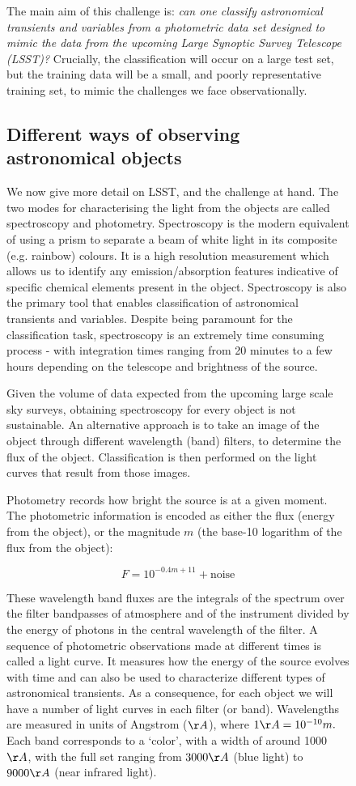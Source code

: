 \documentclass[\docopts]{\docclass}
\begin{document}
\begin{figure}[htbp!]
The main aim of this challenge is: \textit{can one classify astronomical transients and variables from a photometric data set designed to mimic the data from the upcoming Large Synoptic Survey Telescope (LSST)?} Crucially, the classification will occur on a large test set, but the training data will be a small, and poorly representative training set, to mimic the challenges we face observationally.

\subsection{Different ways of observing astronomical objects}
We now give more detail on LSST, and the challenge at hand. The two modes for characterising the light from the objects are called spectroscopy and photometry.
Spectroscopy is the modern equivalent of using a prism to separate a beam of white light in its composite (e.g. rainbow) colours. It is a high resolution measurement which allows us to identify any emission/absorption features indicative of specific chemical elements present in the object.  Spectroscopy is also the primary tool that enables classification of astronomical transients and variables. Despite being paramount for the classification task, spectroscopy is an extremely time consuming process - with integration times ranging from 20 minutes to a few hours depending on the telescope and brightness of the source.

Given the volume of data expected from the upcoming large scale sky surveys, obtaining spectroscopy for every object is not sustainable. An alternative approach is to take an image of the object through different wavelength (band) filters, to determine the flux of the object. Classification is then performed on the light curves that result from those images.

Photometry records how bright the source is at a given moment. The photometric information is encoded as either the flux (energy from the object), or the magnitude $m$ (the base-10 logarithm of the flux from the object):

\begin{equation}
F = 10^{-0.4m+11} + \mbox{noise}
\end{equation}

These wavelength band fluxes are the integrals of the spectrum over the filter bandpasses of atmosphere and of the instrument divided by the energy of photons in the central wavelength of the filter. A sequence of photometric observations made at different times is called a light curve. It measures how the energy of the source evolves with time and can also be used to characterize different types of astronomical transients. As a consequence, for each object we will have a number of light curves in each filter (or band). Wavelengths are measured in units of Angstrom ($\AA$), where $1\AA = 10^{-10} m.$ Each band corresponds to a `color', with a width of around 1000 $\AA$, with the full set ranging from $3000\AA$ (blue light) to $9000\AA$ (near infrared light).


\end{figure}
\end{document}
